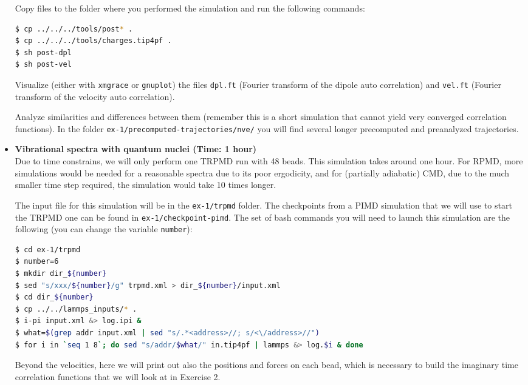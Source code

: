 \documentclass{article}
\begin{document}
\begin{Exercise}[label={realtime},title={Velocity and dipole real time correlation functions}]
\begin{itemize}
Copy files to the folder where you performed the simulation and run the following commands:

\begin{lstlisting}[language=Bash,emph={\$}]
$ cp ../../../tools/post* .
$ cp ../../../tools/charges.tip4pf .
$ sh post-dpl
$ sh post-vel
\end{lstlisting}

Visualize (either with \texttt{xmgrace} or \texttt{gnuplot}) the files \texttt{dpl.ft} (Fourier transform of the dipole auto correlation) and \texttt{vel.ft} (Fourier transform of the velocity auto correlation). 

Analyze similarities and differences between them (remember this is a short simulation that cannot yield very converged correlation functions). In the folder \texttt{ex-1/precomputed-trajectories/nve/} you will find several longer precomputed and preanalyzed trajectories.


\item {\bf Vibrational spectra with quantum nuclei (Time: 1 hour)} \\
Due to time constrains, we will only perform one TRPMD run with 48 beads.
This simulation takes around one hour. For RPMD, more simulations would be needed for a reasonable spectra due to its poor ergodicity, and for (partially adiabatic) CMD, due to the much smaller time step required, the simulation would take 10 times longer.

The input file for this simulation will be in the \texttt{ex-1/trpmd} folder. The checkpoints from a PIMD simulation that we will use to start the TRPMD one can be found in \texttt{ex-1/checkpoint-pimd}. The set of bash commands you will need to launch this simulation are the following (you can change the variable \texttt{number}):

\begin{lstlisting}[language=Bash,emph={\$}]
$ cd ex-1/trpmd
$ number=6
$ mkdir dir_${number} 
$ sed "s/xxx/${number}/g" trpmd.xml > dir_${number}/input.xml
$ cd dir_${number}
$ cp ../../lammps_inputs/* .
$ i-pi input.xml &> log.ipi &
$ what=$(grep addr input.xml | sed "s/.*<address>//; s/<\/address>//")
$ for i in `seq 1 8`; do sed "s/addr/$what/" in.tip4pf | lammps &> log.$i & done
\end{lstlisting}


Beyond the velocities, here we will print out also the positions and forces on each bead, which is necessary to build the imaginary time correlation functions that we will look at in Exercise 2.


\end{itemize}
\end{Exercise}
\end{document}
